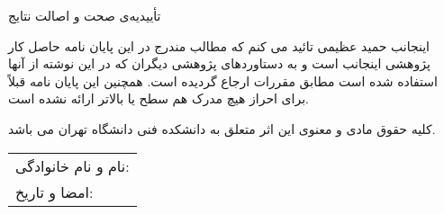 \newpage
\thispagestyle{empty}
\begin{center}
\Large{تأییدیه‌ی صحت و اصالت نتایج}
\end{center}
\begin{large}
اینجانب حمید عظیمی تائید می کنم که مطالب مندرج در این پایان نامه حاصل کار پژوهشی اینجانب است و به دستاوردهای پژوهشی دیگران که در این نوشته از آنها استفاده شده است مطابق مقررات ارجاع گردیده است. همچنین این پایان نامه قبلاً برای احراز هیچ مدرک هم سطح یا بالاتر ارائه نشده است.

کلیه حقوق مادی و معنوی این اثر متعلق به دانشکده فنی دانشگاه تهران می باشد.
\\[1.0cm]
\end{large}
\begin{center}
\begin{tabular}{l}
نام و نام خانوادگی:
\\[0.5cm]
امضا و تاریخ:
\end{tabular}
\end{center}
\newpage
